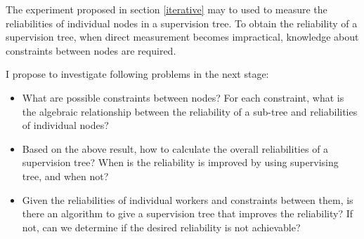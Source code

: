 \documentclass[12pt, authoryear]{article}
\begin{document}
The experiment proposed in section \ref{iterative} may to used to measure the 
reliabilities of individual nodes in a supervision tree.  To obtain the 
reliability of a supervision tree, when direct measurement becomes impractical, 
knowledge about constraints between nodes are required.  

I propose to investigate following problems in the next stage:

\begin{itemize}
  \item What are possible constraints between nodes?  For each constraint, what 
is the algebraic relationship between the reliability of a sub-tree and 
reliabilities of individual nodes?
  \item Based on the above result, how to calculate the overall reliabilities 
of a supervision tree?  When is the reliability is improved by using 
supervising tree, and when not?
  \item Given the reliabilities of individual workers and constraints between 
them, is there an algorithm to give a supervision tree that improves the 
reliability?  If not, can we determine if the desired reliability is not 
achievable? 
\end{itemize}




\end{document}
